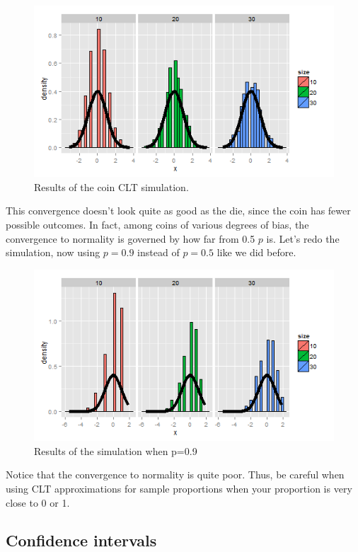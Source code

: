 \documentclass[]{article}
\begin{document}
\begin{figure}[htbp]
\centering
\includegraphics{LeanPub/images/coinCLT-1.png}
\caption{Results of the coin CLT simulation.}
\end{figure}

This convergence doesn't look quite as good as the die, since the coin
has fewer possible outcomes. In fact, among coins of various degrees of
bias, the convergence to normality is governed by how far from 0.5 $p$
is. Let's redo the simulation, now using $p=0.9$ instead of $p=0.5$ like
we did before.

\begin{figure}[htbp]
\centering
\includegraphics{LeanPub/images/coinCLT2-1.png}
\caption{Results of the simulation when p=0.9}
\end{figure}

Notice that the convergence to normality is quite poor. Thus, be careful
when using CLT approximations for sample proportions when your
proportion is very close to 0 or 1.

\subsection{Confidence intervals}\label{confidence-intervals}
\end{document}
